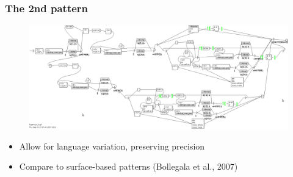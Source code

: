 \documentclass{beamer}
\begin{document}
\begin{frame}
\frametitle{The 2nd pattern}

\begin{figure}	
	\centering
		\includegraphics[width=1.0\textwidth]{figures/pattern2}
	\end{figure}

\begin{itemize}
  \item Allow for language variation, preserving precision
	  \item Compare to surface-based patterns (Bollegala et al., 2007)
	
\end{itemize}

\end{frame}






\end{document}
